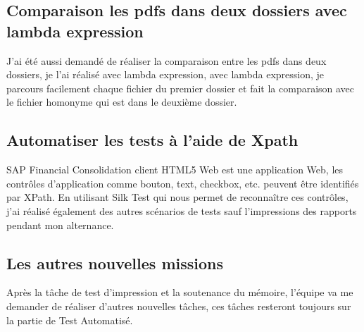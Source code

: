 \documentclass[french]{article}
\begin{document}
	\subsection{Comparaison les pdfs dans deux dossiers avec lambda expression}
	J'ai été aussi demandé de réaliser la comparaison entre les pdfs dans deux dossiers, je l'ai réalisé avec lambda expression, avec lambda expression, je parcours facilement chaque fichier du premier dossier et fait la comparaison avec le fichier homonyme qui est dans le deuxième dossier.
	
	\subsection{Automatiser les tests à l'aide de Xpath}
	SAP Financial Consolidation client HTML5 Web est une application Web, les contrôles d'application  comme bouton, text, checkbox, etc. peuvent être identifiés par XPath. En utilisant Silk Test qui nous permet de reconnaître ces contrôles, j'ai réalisé également des autres scénarios de tests sauf l'impressions des rapports pendant mon alternance.
	
	\subsection{Les autres nouvelles missions}
	Après la tâche de test d'impression et la soutenance du mémoire, l'équipe va me demander de réaliser d'autres nouvelles tâches, ces tâches resteront toujours sur la partie de Test Automatisé. 
	
\end{document}
